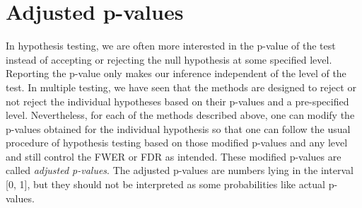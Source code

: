 \documentclass[
]{book}
\begin{document}
\hypertarget{adjusted-pvalues}{%
\section{Adjusted p-values}\label{adjusted-pvalues}}

In hypothesis testing, we are often more interested in the p-value of the test instead of accepting or rejecting the null hypothesis at some specified level. Reporting the p-value only makes our inference independent of the level of the test. In multiple testing, we have seen that the methods are designed to reject or not reject the individual hypotheses based on their p-values and a pre-specified level. Nevertheless, for each of the methods described above, one can modify the p-values obtained for the individual hypothesis so that one can follow the usual procedure of hypothesis testing based on those modified p-values and any level and still control the FWER or FDR as intended. These modified p-values are called \emph{adjusted p-values}. The adjusted p-values are numbers lying in the interval {[}0, 1{]}, but they should not be interpreted as some probabilities like actual p-values.
\end{document}

